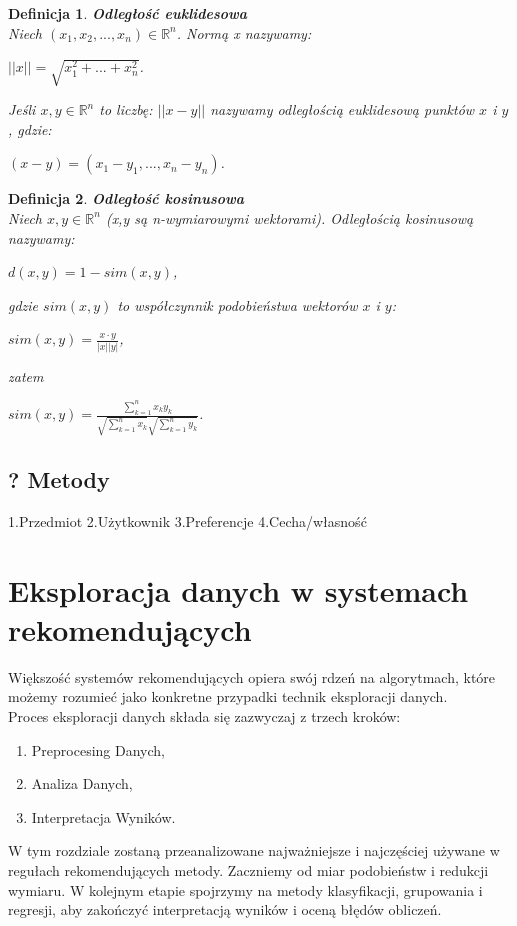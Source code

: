 \documentclass[12pt,a4paper]{report}
\newtheorem{df}{Definicja}
\begin{document}
\begin{df}\textbf{Odległość euklidesowa} %
\\Niech $(x_1,x_2,...,x_n) \in \mathbb{R}^n $.
Normą x nazywamy:
\begin{center}
$||x|| = \sqrt{x_{1}^{2} + ... + x_{n}^{2}}$.
\end{center}
Jeśli $x,y \in \mathbb{R}^n $ to liczbę:
$||x-y||$ nazywamy odległością euklidesową punktów $x$ i $y$, gdzie:
\begin{center}
$(x-y) = (x_1-y_1,...,x_n-y_n)$.
\end{center}
\end{df}
\begin{df}\textbf{Odległość kosinusowa} %
\\Niech $x,y \in \mathbb{R}^n $ (x,y są n-wymiarowymi wektorami). Odległością kosinusową nazywamy:
\begin{center}
$d(x,y) = 1 - sim (x,y)$, 
\end{center}
gdzie $sim (x,y)$ to współczynnik podobieństwa wektorów $x$ i $y$:
\begin{center}
$sim (x,y) = \frac{x \cdot y}{|x||y|}$,
\end{center}
zatem
\begin{center}
$sim (x,y) = \frac{\sum_{k=1}^n x_k y_k}{\sqrt{\sum_{k=1}^n x_k}\sqrt{\sum_{k=1}^n y_k}}$.
\end{center}
\end{df}

\section{? Metody}
1.Przedmiot 2.Użytkownik 3.Preferencje 4.Cecha/własność

\chapter{Eksploracja danych w systemach rekomendujących}
Większość systemów rekomendujących opiera swój rdzeń na algorytmach, które możemy rozumieć jako konkretne przypadki technik eksploracji danych. 
\\Proces eksploracji danych składa się zazwyczaj z trzech kroków:
\begin{enumerate}
\item Preprocesing Danych,
\item Analiza Danych,
\item Interpretacja Wyników.
\end{enumerate}
W tym rozdziale zostaną przeanalizowane najważniejsze i najczęściej używane w regułach rekomendujących metody. Zaczniemy od miar podobieństw i redukcji wymiaru. W kolejnym etapie spojrzymy na metody klasyfikacji, grupowania i regresji, aby zakończyć interpretacją wyników i oceną błędów obliczeń.
\end{document}
